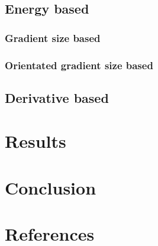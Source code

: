\documentclass[a4paper,10pt]{article}
\begin{document}
\subsection{Energy based}\label{sec:fit_energy}

\subsubsection{Gradient size based}


\subsubsection{Orientated gradient size based}



\subsection{Derivative based}\label{sec:fit_deriv}


\section{Results}\label{sec:results}

\section{Conclusion}


\section{References}


\end{document}

